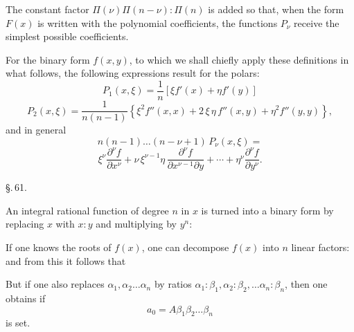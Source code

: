 
The constant factor $\Pi(\nu)\Pi(n-\nu):\Pi(n)$ is added so that,
when the form $F(x)$ is written with the polynomial coefficients,
the functions $P_\nu$ receive the simplest possible coefficients.

For the binary form $f(x,y)$, to which we shall chiefly apply
these definitions in what follows, the following expressions
result for the polars:
\[
P_1(x,\xi) = \frac{1}{n}\left[\xi f'(x) + \eta f'(y)\right]
\]
\[
P_2(x,\xi) = \frac{1}{n(n-1)}\left\{\xi^2 f''(x,x) + 2\,\xi\,\eta\, f''(x,y) + \eta^2 f''(y,y)\right\},
\]
and in general
\[
n(n-1)\ldots(n-\nu+1)\,P_\nu(x,\xi) =
\]
\[
\xi^\nu\frac{\partial^\nu f}{\partial x^\nu} + \nu\,\xi^{\nu-1}\eta\,\frac{\partial^\nu f}{\partial x^{\nu-1}\partial y} + \cdots + \eta^\nu\frac{\partial^\nu f}{\partial y^\nu}.
\]

\begin{center}
\S.\,61.

\end{center}

An integral rational function of degree $n$ in $x$
is turned into a binary form by replacing $x$ with $x:y$
and multiplying by $y^n$:

If one knows the roots of $f(x)$, one can decompose $f(x)$
into $n$ linear factors:
and from this it follows that

But if one also replaces $\alpha_1, \alpha_2\ldots\alpha_n$ by
ratios $\alpha_1:\beta_1, \alpha_2:\beta_2, \ldots \alpha_n:\beta_n$, then
one obtains
if
\[
a_0 = A\beta_1\beta_2\ldots\beta_n
\]
is set.
